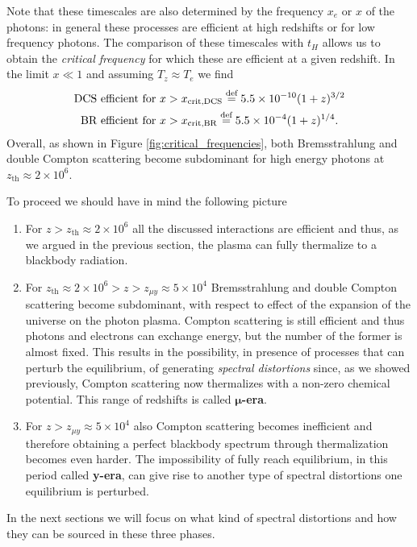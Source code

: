 Note that these timescales are also determined by the frequency $x_e$ or $x$ of the photons: in general these processes are efficient at high redshifts or for low frequency photons. The comparison of these timescales with $t_H$ allows us to obtain the \emph{critical frequency} for which these are efficient at a given redshift.
In the limit $x\ll1$ and assuming $T_z\approx T_e$ we find
\begin{align*}
    \text{DCS efficient for }x&>x_{\text{crit,DCS}}\stackrel{\text{def}}{=}5.5\times10^{-10}(1+z)^{3/2}\\
    \text{BR efficient for }x&>x_{\text{crit,BR}}\stackrel{\text{def}}{=}5.5\times10^{-4}(1+z)^{1/4}.
\end{align*}  
Overall, as shown in Figure \ref{fig:critical_frequencies}, both Bremsstrahlung and double Compton scattering become subdominant for high energy photons at $z_{\text{th}}\approx2\times10^6$.\newpage

To proceed we should have in mind the following picture
\begin{enumerate}
    \item For $z>z_{\text{th}}\approx2\times10^6$ all the discussed interactions are efficient and thus, as we argued in the previous section, the plasma can fully thermalize to a blackbody radiation.
    \item For $z_{\text{th}}\approx2\times10^6>z>z_{\mu y}\approx 5\times 10^4$ Bremsstrahlung and double Compton scattering become subdominant, with respect to effect of the expansion of the universe on the photon plasma. Compton scattering is still efficient and thus photons and electrons can exchange energy, but the number of the former is almost fixed. This results in the possibility, in presence of processes that can perturb the equilibrium, of generating \emph{spectral distortions} since, as we showed previously, Compton scattering now thermalizes with a non-zero chemical potential. This range of redshifts is called $\boldsymbol{\mu}$\textbf{-era}.
    \item For $z>z_{\mu y}\approx 5\times 10^4$ also Compton scattering becomes inefficient and therefore obtaining a perfect blackbody spectrum through thermalization becomes even harder. The impossibility of fully reach equilibrium, in this period called \textbf{y-era}, can give rise to another type of spectral distortions one equilibrium is perturbed.
\end{enumerate}
In the next sections we will focus on what kind of spectral distortions and how they can be sourced in these three phases.

